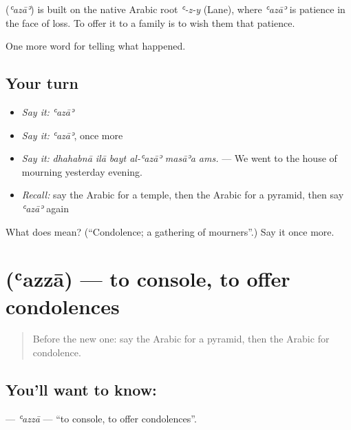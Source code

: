 \begin{cousinweb}
\textbf{} (\emph{ʿazāʾ}) is built on the native Arabic root \emph{ʿ-z-y} (Lane), where \emph{ʿazāʾ} is patience in the face of loss. To offer it to a family is to wish them that patience.
\end{cousinweb}

\begin{grammarlens}[title={What you've built}]
One more word for telling what happened.
\end{grammarlens}

\subsection*{Your turn}
\begin{itemize}
\raggedright
  \item \emph{Say it:} \emph{ʿazāʾ}
  \item \emph{Say it:} \emph{ʿazāʾ}, once more
  \item \emph{Say it:} \emph{dhahabnā ilā bayt al-ʿazāʾ masāʾa ams.} — We went to the house of mourning yesterday evening.
  \item \emph{Recall:} say the Arabic for a temple, then the Arabic for a pyramid, then say \emph{ʿazāʾ} again
\end{itemize}

\begin{tcolorbox}[breakable,colback=teal!4,colframe=teal!35!black,title={Before you move on}]
What does  mean? (\textquotedblleft{}Condolence; a gathering of mourners\textquotedblright{}.) Say it once more.
\end{tcolorbox}
\section[\texorpdfstring{\ar{عزى} (ʿazzā)}{عزى (ʿazzā)}]{ (ʿazzā) — to console, to offer condolences}

\label{lesson:AR-C319-azza}



\begin{quote}
Before the new one: say the Arabic for a pyramid, then the Arabic for condolence.
\end{quote}

\subsection*{You'll want to know: }
\textbf{} — \emph{ʿazzā} — \textquotedblleft{}to console, to offer condolences\textquotedblright{}.

